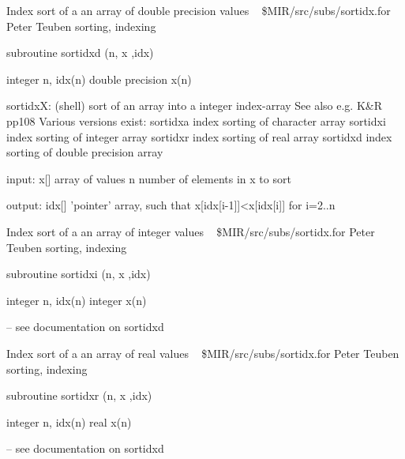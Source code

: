 %
\noindent Index sort of a an array of double precision values
\newline \ 
\newline {} \$MIR/src/subs/sortidx.for
\newline {} Peter Teuben
\newline {} sorting, indexing
\par{\tenpoint
{\eightpoint\begintt
      subroutine sortidxd (n, x ,idx)

      integer n, idx(n)
      double precision x(n)

  sortidxX:  (shell) sort of an array into a integer index-array
               See also e.g. K&R pp108
       Various versions exist:
           sortidxa    index sorting of character array
           sortidxi    index sorting of integer array
           sortidxr    index sorting of real array
           sortidxd    index sorting of double precision array

       input:  x[]   array of values
               n     number of elements in x to sort

       output: idx[] 'pointer' array, such that x[idx[i-1]]<x[idx[i]] for
                     i=2..n
\endtt}
\par}
%
\noindent Index sort of a an array of integer values
\newline \ 
\newline {} \$MIR/src/subs/sortidx.for
\newline {} Peter Teuben
\newline \abox{Keywords:} sorting, indexing
\par{\tenpoint
{\eightpoint\begintt
      subroutine sortidxi (n, x ,idx)

      integer n, idx(n)
      integer x(n)

       -- see documentation on sortidxd
\endtt}
\par}
%
\noindent Index sort of a an array of real values
\newline \ 
\newline {} \$MIR/src/subs/sortidx.for
\newline \abox{Responsible:} Peter Teuben
\newline {} sorting, indexing
\par{\tenpoint
{\eightpoint\begintt
      subroutine sortidxr (n, x ,idx)

      integer n, idx(n)
      real x(n)

       -- see documentation on sortidxd
\endtt}
\par}
